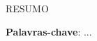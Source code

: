 






\setlength{\absparsep}{18pt} %
\begin{resumo}

	RESUMO

	\vspace{\onelineskip}
	\textbf{Palavras-chave}: ...
\end{resumo}

